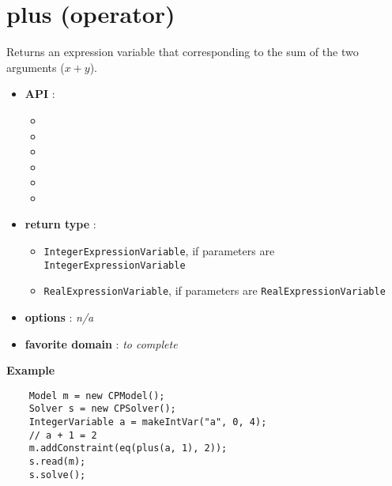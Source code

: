 \label{plus}
\hypertarget{plus}{}



\section{plus (operator)}\label{plus:plusoperator}\hypertarget{plus:plusoperator}{}
Returns an expression variable that corresponding to the sum of the two arguments (\(x+y\)).

\begin{itemize}
	\item \textbf{API} :
	\begin{itemize}
		\item {}
		\item {}
		\item {}
		\item {}
		\item {}
		\item {}
	\end{itemize}
	\item \textbf{return type} :
	\begin{itemize}
		\item \texttt{IntegerExpressionVariable}, if parameters are \texttt{IntegerExpressionVariable}
		\item \texttt{RealExpressionVariable}, if parameters are \texttt{RealExpressionVariable}
	\end{itemize}
	\item \textbf{options} : \emph{n/a}
	\item \textbf{favorite domain} : \emph{to complete}
\end{itemize}

\textbf{Example}

\begin{lstlisting}
	Model m = new CPModel();
	Solver s = new CPSolver();
	IntegerVariable a = makeIntVar("a", 0, 4);
    // a + 1 = 2
	m.addConstraint(eq(plus(a, 1), 2));
	s.read(m);
	s.solve();
\end{lstlisting}

